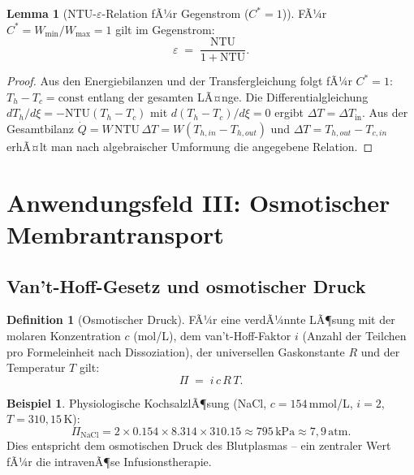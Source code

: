 ﻿\documentclass[a4paper,12pt]{article}
\theoremstyle{definition}
\newtheorem{definition}{Definition}
\newtheorem{beispiel}{Beispiel}
\newtheorem{lemma}{Lemma}
\begin{document}
\begin{lemma}[NTU-$\varepsilon$-Relation fÃ¼r Gegenstrom ($C^* = 1$)]
    FÃ¼r $C^* = W_{\min}/W_{\max} = 1$ gilt im Gegenstrom:
    \[
        \varepsilon \;=\; \frac{\mathrm{NTU}}{1 + \mathrm{NTU}}.
    \]
\end{lemma}

\begin{proof}
    Aus den Energiebilanzen und der Transfergleichung folgt fÃ¼r $C^*=1$:
    $T_h - T_c = \text{const}$ entlang der gesamten LÃ¤nge. Die Differentialgleichung
    $dT_h/d\xi = -\mathrm{NTU}(T_h - T_c)$ mit $d(T_h - T_c)/d\xi = 0$
    ergibt $\Delta T = \Delta T_{\text{in}}$. Aus der Gesamtbilanz
    $\dot{Q} = W\,\mathrm{NTU}\,\Delta T = W(T_{h,in} - T_{h,out})$
    und $\Delta T = T_{h,out} - T_{c,in}$ erhÃ¤lt man nach algebraischer
    Umformung die angegebene Relation. \qedhere
\end{proof}

\section{Anwendungsfeld III: Osmotischer Membrantransport}

\subsection{Van't-Hoff-Gesetz und osmotischer Druck}

\begin{definition}[Osmotischer Druck]
    FÃ¼r eine verdÃ¼nnte LÃ¶sung mit der molaren Konzentration $c$ (mol/L),
    dem van't-Hoff-Faktor $i$ (Anzahl der Teilchen pro Formeleinheit nach
    Dissoziation), der universellen Gaskonstante $R$ und der Temperatur $T$ gilt:
    \[
        \Pi \;=\; i\,c\,R\,T.
    \]
\end{definition}

\begin{beispiel}
    Physiologische KochsalzlÃ¶sung (NaCl, $c = 154$\,mmol/L, $i = 2$,
    $T = 310{,}15$\,K):
    \[
        \Pi_{\mathrm{NaCl}} = 2 \times 0.154 \times 8.314 \times 310.15
        \approx 795\,\mathrm{kPa} \approx 7{,}9\,\mathrm{atm}.
    \]
    Dies entspricht dem osmotischen Druck des Blutplasmas -- ein zentraler
    Wert fÃ¼r die intravenÃ¶se Infusionstherapie.
\end{beispiel}
\end{document}
